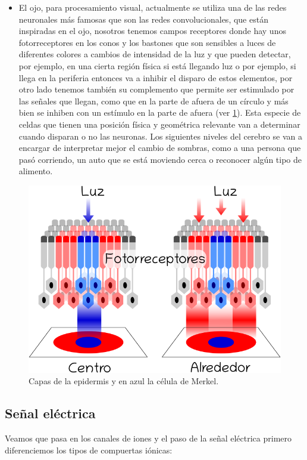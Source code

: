 \begin{itemize}
\item El ojo, para procesamiento visual, actualmente se utiliza una de las redes neuronales más famosas que son las redes convolucionales, que están inspiradas en el ojo, nosotros tenemos campos receptores donde hay unos fotorreceptores en los conos y los bastones que son sensibles a luces de diferentes colores a cambios de intensidad de la luz y que pueden detectar, por ejemplo, en una cierta región física si está llegando luz  o por ejemplo, si llega en la periferia entonces va a inhibir el disparo de estos elementos, por otro lado tenemos también su complemento que permite ser estimulado por las señales que llegan, como que en la parte de afuera de un círculo y más bien se inhiben con un estímulo en la parte de afuera (ver \ref{fig:nSen}). Esta especie de celdas que tienen una posición física y geométrica relevante van a determinar cuando disparan o no las neuronas. Los siguientes niveles del cerebro se van a encargar de interpretar mejor  el cambio de sombras, como a una persona que pasó corriendo, un auto que se está moviendo cerca o reconocer algún tipo de alimento.
\end{itemize}

\begin{figure}[h]
 \centering
 \includegraphics[scale=0.5]{../Figuras/nSensitivas.png}
 \caption{Capas de la epidermis y en azul la célula de Merkel.}
 \label{fig:nSen}
\end{figure}


\subsection{Señal eléctrica}
Veamos que pasa en los canales de iones y el paso de la señal eléctrica primero diferenciemos los tipos de compuertas iónicas:

